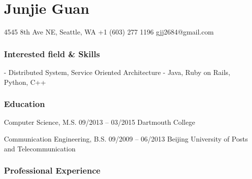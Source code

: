 \documentclass{tccv}
\begin{document}
\part{Junjie Guan}
	
\begin{multicols}{2}

\personal
    {4545 8th Ave NE, Seattle, WA}
    {+1 (603) 277 1196}
    {gjj2684@gmail.com}

\section{Interested field \& Skills}
- Distributed System, Service Oriented Architecture	
- Java, Ruby on Rails, Python, C++









\end{multicols}






\section{Education}

\begin{yearlist}

\item[Computer Science, M.S.]{09/2013 -- 03/2015}
     {Dartmouth College}

\item[Communication Engineering, B.S.]{09/2009 -- 06/2013}
     {Beijing University of Posts and Telecommunication}

\end{yearlist}









\section{Professional Experience}
\end{document}
